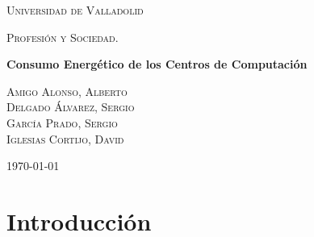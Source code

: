 \documentclass[10pt]{article}
\begin{document}
	\begin{titlepage}
      \centering
          {\scshape\LARGE Universidad de Valladolid \par}
          \vspace{1cm}
          {\scshape\Large Profesión y Sociedad.\par}
          \vspace{1.5cm}
          {\huge\bfseries Consumo Energético de los Centros de Computación \par}
          \vspace{2cm}
          {\large
          \textsc{Amigo Alonso, Alberto}\\[2mm] %
          \textsc{Delgado Álvarez, Sergio}\\[2mm] %
          \textsc{García Prado, Sergio}\\[2mm] %
          \textsc{Iglesias Cortijo, David}\\[2mm] %

          \vspace{-5mm}
          }

          \vfill
		{\large \today\par}
	\end{titlepage}


	\clearpage
	\tableofcontents


	\clearpage
  \section{Introducción}
	\label{sec:introducion}
    \paragraph{}
\end{document}
